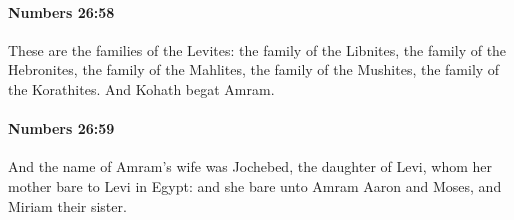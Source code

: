 		\paragraph{Numbers 26:58} %
			\label{NUMBERS-26-58}

			These are the families of the Levites: the family of the Libnites, the family of the Hebronites, the family of the Mahlites, the family of the Mushites, the family of the Korathites. And Kohath begat Amram.


		\paragraph{Numbers 26:59} %
			\label{NUMBERS-26-59}

			And the name of Amram’s wife was Jochebed, the daughter of Levi, whom her mother bare to Levi in Egypt: and she bare unto Amram Aaron and Moses, and Miriam their sister.

